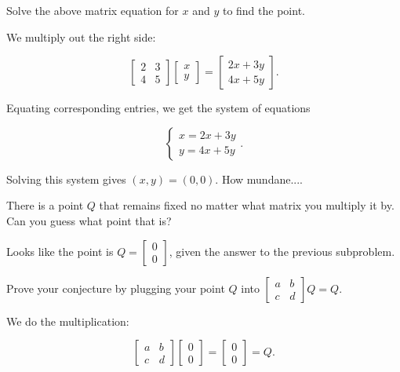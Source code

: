 \documentclass[../gatm_answers.tex]{subfiles}
\begin{document}
\begin{inner_problem}[start=1]
\item Solve the above matrix equation for $x$ and $y$ to find the point.
\end{inner_problem}

We multiply out the right side:

$$\begin{bmatrix}2 & 3 \\ 4 & 5 \end{bmatrix} \begin{bmatrix} x \\ y \end{bmatrix} = \begin{bmatrix}2x + 3y \\ 4x + 5y \end{bmatrix}.$$

Equating corresponding entries, we get the system of equations

$$\begin{cases} x = 2x + 3y \\ y = 4x + 5y \end{cases}.$$

Solving this system gives $(x,y)=(0,0)$. How mundane....

\begin{inner_problem}
\item There is a point $Q$ that remains fixed no matter what matrix you multiply it by. Can you guess what point that is?
\end{inner_problem}

Looks like the point is $Q=\begin{bmatrix} 0 \\ 0 \end{bmatrix}$, given the answer to the previous subproblem.

\begin{inner_problem}
\item Prove your conjecture by plugging your point $Q$ into $\left[\begin{array}{cc}a & b \\ c & d\end{array}\right]Q=Q$.
\end{inner_problem}

We do the multiplication:

$$\begin{bmatrix} a & b \\ c & d \end{bmatrix} \begin{bmatrix} 0 \\ 0 \end{bmatrix} = \begin{bmatrix} 0 \\ 0 \end{bmatrix} = Q.$$
\end{document}

